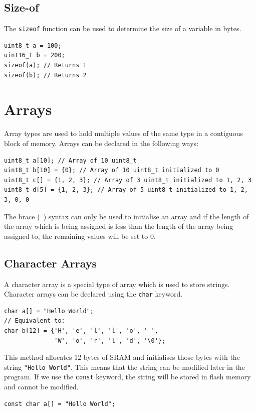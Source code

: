 \documentclass[a4paper]{report}
\begin{document}
\subsection{Size-of}
The \texttt{sizeof} function can be used to determine the size of a variable in bytes.
\begin{verbatim}
uint8_t a = 100;
uint16_t b = 200;
sizeof(a); // Returns 1
sizeof(b); // Returns 2
\end{verbatim}
\section{Arrays}
Array types are used to hold multiple values of the same type
in a contiguous block of memory.
Arrays can be declared in the following ways:
\begin{verbatim}
uint8_t a[10]; // Array of 10 uint8_t
uint8_t b[10] = {0}; // Array of 10 uint8_t initialized to 0
uint8_t c[] = {1, 2, 3}; // Array of 3 uint8_t initialized to 1, 2, 3
uint8_t d[5] = {1, 2, 3}; // Array of 5 uint8_t initialized to 1, 2, 3, 0, 0
\end{verbatim}
The brace (\texttt{{ }}) syntax can only be used to initialise an array and if the length of the array which is being
assigned is less than the length of the array being assigned to, the remaining values will be set to 0.
\subsection{Character Arrays}
A character array is a special type of array which is used to store strings.
Character arrays can be declared using the \texttt{char} keyword.
\begin{verbatim}
char a[] = "Hello World";
// Equivalent to:
char b[12] = {'H', 'e', 'l', 'l', 'o', ' ',
              'W', 'o', 'r', 'l', 'd', '\0'};
\end{verbatim}
This method allocates 12 bytes of SRAM and
initialises those bytes with the string \texttt{"Hello World"}. %
This means that the string can be modified later in the program.
If we use the \texttt{const} keyword, the string will be stored in flash memory and cannot be modified.
\begin{verbatim}
const char a[] = "Hello World";
\end{verbatim}
\end{document}
